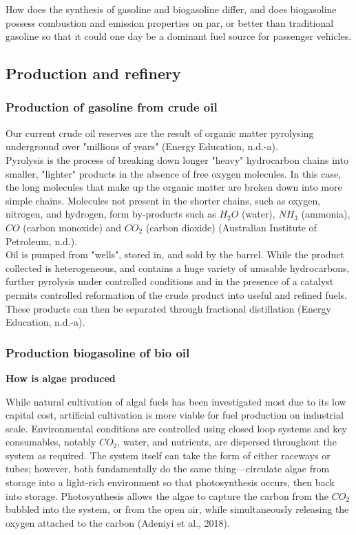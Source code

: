 \documentclass[10pt,a4paper]{article}
\begin{document}
	How does the synthesis of gasoline and biogasoline differ, and does biogasoline possess combustion and emission properties on par, or better than traditional gasoline so that it could one day be a dominant fuel source for passenger vehicles. 
	\newpage
	\subsection{Production and refinery}
    \subsubsection{Production of gasoline from crude oil}
	
	Our current crude oil reserves are the result of organic matter
	pyrolysing underground over "millions of years" (Energy Education,
	n.d.-a).\\
	Pyrolysis is the process of breaking down longer "heavy" hydrocarbon
	chains into smaller, "lighter" products in the absence of free oxygen
	molecules. In this case, the long molecules that make up the organic
	matter are broken down into more simple chains. Molecules not present in
	the shorter chains, such as oxygen, nitrogen, and hydrogen, form
	by-products such as $H_2O$ (water), $NH_3$ (ammonia), $CO$ (carbon monoxide) and
	$CO_2$ (carbon dioxide) (Australian Institute of Petroleum, n.d.).\\
	Oil is pumped from "wells", stored in, and sold by the barrel.
	While the product collected is heterogeneous, and contains a huge
	variety of unusable hydrocarbons, further pyrolysis under controlled
	conditions and in the presence of a catalyst permits controlled
	reformation of the crude product into useful and refined fuels. These
	products can then be separated through fractional distillation (Energy
	Education, n.d.-a).
	\subsubsection{Production biogasoline of bio oil}\label{production-of-bio-oil}
	
	\textbf{How is algae produced}\label{how-is-algae-produced}
	
	While natural cultivation of algal fuels has been investigated most due to its low capital
	cost, artificial cultivation is more viable for fuel production on
	industrial scale. Environmental conditions are controlled using closed
	loop systems and key consumables, notably $CO_2$, water, and nutrients, are
	dispersed throughout the system as required. The system itself can take
	the form of either \textquotesingle raceways\textquotesingle{} or tubes; 
	however, both fundamentally do the same thing---circulate algae from
	storage into a light-rich environment so that photosynthesis occurs,
	then back into storage. Photosynthesis allows the algae to
	\textquotesingle capture\textquotesingle{} the carbon from the $CO_2$
	bubbled into the system, or from the open air, while simultaneously
	releasing the oxygen attached to the carbon (Adeniyi et al., 2018). 
	
\end{document}
